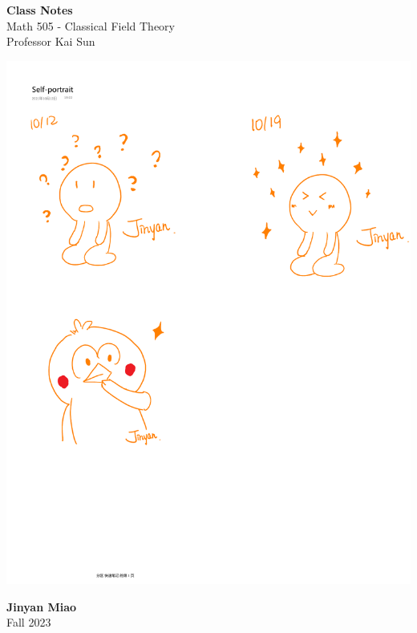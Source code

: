 \documentclass[11pt, onesided]{book}
\theoremstyle{break}
\theoremstyle{break}
\begin{document}
	\begin{titlepage}
		\begin{center}
			\vspace*{0.5cm}
			\Huge \color{red}
				\textbf{Class Notes}\\
			\vspace{0.5cm}			
			\Large \color{black}
			Math 505 - Classical Field Theory\\
			Professor Kai Sun
			\vspace{1.5cm}

			\includegraphics[scale=1.15]{hmm.pdf}
			
			
			\vspace{2cm}
			\LARGE
				\textbf{Jinyan Miao}\\
				\hfill\break
				\LARGE Fall 2023\\
			\vspace{1cm}

		\vspace*{\fill}
		\end{center}			
	\end{titlepage}
\end{document}
